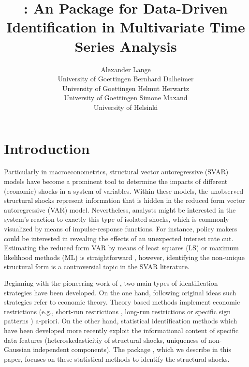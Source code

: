 \documentclass[nojss]{jss}\usepackage[]{graphicx}\usepackage[]{color}
\author{Alexander Lange\\University of Goettingen
    \And Bernhard Dalheimer\\University of Goettingen
    \AND Helmut Herwartz\\University of Goettingen
	\And Simone Maxand\\University of Helsinki
   }
\title{\pkg{svars}: An \proglang{R} Package for Data-Driven Identification in Multivariate Time Series Analysis}
\begin{document}



\section[Introduction]{Introduction} \label{sec:intro}

Particularly in macroeconometrics, structural vector autoregressive (SVAR) models have become a prominent tool to determine the impacts of different (economic) shocks in a system of variables. Within these models, the unobserved structural shocks represent information that is hidden in the reduced form vector autoregressive (VAR) model. Nevertheless, analysts might be interested in the system's reaction to exactly this type of isolated shocks, which is commonly visualized by means of impulse-response functions. For instance, policy makers could be interested in revealing the effects of an unexpected interest rate cut. Estimating the reduced form VAR by means of least squares (LS) or maximum likelihood methods (ML) is straightforward \citep[see, e.g.,][]{IntroductionMultipleTS}, however, identifying the non-unique structural form is a controversial topic in the SVAR literature. %

Beginning with the pioneering work of \cite{Sims1980}, two main types of identification strategies have been developed. On the one hand, following \cite{Sims1980} original ideas such strategies refer to economic theory. Theory based methods implement economic restrictions (e.g., short-run restrictions \citep{Sims1980}, long-run restrictions \citep{BlacnchardQuah1989} or specific sign patterns \citep{Uhlig2005}) a-priori. On the other hand,  statistical identification methods which have been developed more recently exploit the informational content of specific data features (heteroskedasticitiy of structural shocks, uniqueness of non-Gaussian independent components).  The  package , which we describe in this paper, focuses on these statistical methods to identify the structural shocks.%
\end{document}
